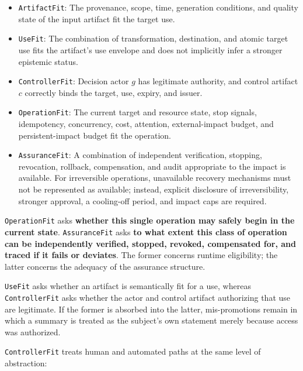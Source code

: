 \begin{itemize}
\tightlist
\item
  \passthrough{\lstinline!ArtifactFit!}: The provenance, scope, time, generation conditions, and quality state of the input artifact fit the target use.
\item
  \passthrough{\lstinline!UseFit!}: The combination of transformation, destination, and atomic target use fits the artifact's use envelope and does not implicitly infer a stronger epistemic status.
\item
  \passthrough{\lstinline!ControllerFit!}: Decision actor \(g\) has legitimate authority, and control artifact \(c\) correctly binds the target, use, expiry, and issuer.
\item
  \passthrough{\lstinline!OperationFit!}: The current target and resource state, stop signals, idempotency, concurrency, cost, attention, external-impact budget, and persistent-impact budget fit the operation.
\item
  \passthrough{\lstinline!AssuranceFit!}: A combination of independent verification, stopping, revocation, rollback, compensation, and audit appropriate to the impact is available. For irreversible operations, unavailable recovery mechanisms must not be represented as available; instead, explicit disclosure of irreversibility, stronger approval, a cooling-off period, and impact caps are required.
\end{itemize}

\passthrough{\lstinline!OperationFit!} asks \textbf{whether this single operation may safely begin in the current state}. \passthrough{\lstinline!AssuranceFit!} asks \textbf{to what extent this class of operation can be independently verified, stopped, revoked, compensated for, and traced if it fails or deviates}. The former concerns runtime eligibility; the latter concerns the adequacy of the assurance structure.

\passthrough{\lstinline!UseFit!} asks whether an artifact is semantically fit for a use, whereas \passthrough{\lstinline!ControllerFit!} asks whether the actor and control artifact authorizing that use are legitimate. If the former is absorbed into the latter, mis-promotions remain in which a summary is treated as the subject's own statement merely because access was authorized.

\passthrough{\lstinline!ControllerFit!} treats human and automated paths at the same level of abstraction:

